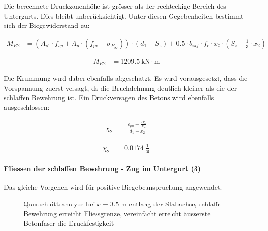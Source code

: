 \documentclass[
  11pt,
  letterpaper,
]{scrreprt}
\let\oldparagraph\paragraph
\renewcommand{\paragraph}[1]{\oldparagraph{#1}\mbox{}}
\begin{document}
Die berechnete Druckzonenhöhe ist grösser als der rechteckige Bereich
des Untergurts. Dies bleibt unberücksichtigt. Unter diesen Gegebenheiten
bestimmt sich der Biegewiderstand zu:

$$
\begin{aligned}
M_{R2} &= \left( A_{s1} \cdot f_{sy} + A_{p} \cdot \left( f_{pu} - \sigma_{P_{\infty}} \right) \right) \cdot \left( d_{1} - S_{z} \right) + 0.5 \cdot b_{inf} \cdot f_{c} \cdot x_{2} \cdot \left( S_{z} - \frac{ 1 }{ 3 } \cdot x_{2} \right) \; 
\end{aligned}
$$

$$
\begin{aligned}
M_{R2} &= 1209.5\ \mathrm{kN} \cdot \mathrm{m} \;
\end{aligned}
$$

Die Krümmung wird dabei ebenfalls abgeschätzt. Es wird vorausgesetzt,
dass die Vorspannung zuerst versagt, da die Bruchdehnung deutlich
kleiner als die der schlaffen Bewehrung ist. Ein Druckversagen des
Betons wird ebenfalls ausgeschlossen:

$$
\begin{aligned}
\chi_{2} &= \frac{ \varepsilon_{pu} - \frac{ \sigma_{P_{\infty}} }{ E_{p} } }{ d_{1} - x_{2} } \; 
\end{aligned}
$$

$$
\begin{aligned}
\chi_{2} &= 0.0174\ \frac{1}{\mathrm{m}} \;
\end{aligned}
$$

\paragraph{Fliessen der schlaffen Bewehrung - Zug im Untergurt
(3)}\label{fliessen-der-schlaffen-bewehrung---zug-im-untergurt-3}

Das gleiche Vorgehen wird für positive Biegebeanspruchung angewendet.

\begin{figure}[H]


\caption{\label{fig-t6_qs_MR_neg}Querschnittsanalyse bei \(x=3.5\) m
entlang der Stabachse, schlaffe Bewehrung erreicht Fliessgrenze,
vereinfacht erreicht äusserste Betonfaser die Druckfestigkeit}

\end{figure}%
\end{document}

